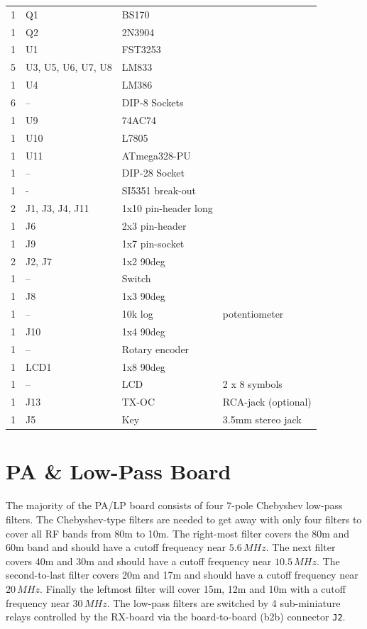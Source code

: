 \documentclass[10pt, a4paper,twoside]{scrartcl}
\begin{document}
\begin{longtable}{|l|p{6cm}|l|l|}
1 & Q1 & BS170 & \\
1 & Q2 & 2N3904 & \\
1 & U1 & FST3253 & \\
5 & U3, U5, U6, U7, U8 & LM833 & \\
1 & U4 & LM386 & \\ 
6 & -- & DIP-8 Sockets & \\
1 & U9 & 74AC74 & \\
1 & U10 & L7805 & \\
1 & U11 & ATmega328-PU & \\
1 & --  & DIP-28 Socket & \\
1 & - & SI5351 break-out & \\
2 & J1, J3, J4, J11 & 1x10 pin-header long & \\
1 & J6 & 2x3 pin-header & \\
1 & J9 & 1x7 pin-socket & \\
2 & J2, J7 & 1x2 90deg & \\
1 & -- & Switch & \\
1 & J8 & 1x3 90deg & \\
1 & -- & 10k log & potentiometer \\
1 & J10 & 1x4 90deg & \\
1 & -- & Rotary encoder & \\
1 & LCD1 & 1x8 90deg & \\
1 & -- & LCD & 2 x 8 symbols \\
1 & J13 & TX-OC & RCA-jack (optional) \\
1 & J5 & Key & 3.5mm stereo jack\\ \hline
\end{longtable}


\cleardoublepage
\section{PA \& Low-Pass Board} \label{sec:pa}
The majority of the PA/LP board consists of four 7-pole Chebyshev low-pass filters. The Chebyshev-type filters are needed to get away with only four filters to cover all RF bands from 80m to 10m. The right-most filter covers the 80m and 60m band and should have a cutoff frequency near $5.6\,MHz$. The next filter covers 40m and 30m and should have a cutoff frequency near $10.5\,MHz$. The second-to-last filter covers 20m and 17m and should have a cutoff frequency near $20\,MHz$. Finally the leftmost filter will cover 15m, 12m and 10m with a cutoff frequency near $30\,MHz$. The low-pass filters are switched by 4 sub-miniature relays controlled by the RX-board via the board-to-board (b2b) connector \texttt{J2}.
\end{document}
